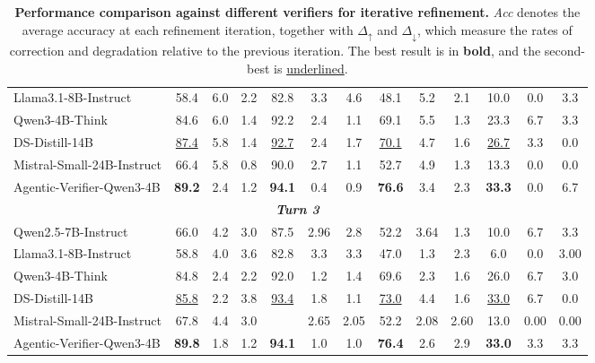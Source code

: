 \documentclass[11pt]{article}
\begin{document}
\begin{table}[t]
{\begin{tabular}{l|cccccccccccc}
Llama3.1-8B-Instruct
& 58.4 & 6.0 & 2.2
& 82.8 & 3.3 & 4.6
& 48.1 & 5.2 & 2.1
& 10.0 & 0.0 & 3.3 \\

Qwen3-4B-Think
& 84.6 & 6.0 & 1.4
& 92.2 & 2.4 & 1.1
& 69.1 & 5.5 & 1.3
& 23.3 & 6.7 & 3.3 \\

DS-Distill-14B
& \underline{87.4} & 5.8 & 1.4
& \underline{92.7} & 2.4 & 1.7
& \underline{70.1} & 4.7 & 1.6
& \underline{26.7} & 3.3 & 0.0 \\

Mistral-Small-24B-Instruct
& 66.4 & 5.8 & 0.8
& 90.0 & 2.7 & 1.1
& 52.7 & 4.9 & 1.3
& 13.3 & 0.0 & 0.0 \\

Agentic-Verifier-Qwen3-4B
& \textbf{89.2} & 2.4 & 1.2
& \textbf{94.1} & 0.4 & 0.9
& \textbf{76.6} & 3.4 & 2.3
& \textbf{33.3} & 0.0 & 6.7 \\
        \midrule
            \multicolumn{13}{c}{\textit{\textbf{Turn 3}}} \\
        \midrule
        Qwen2.5-7B-Instruct
& 66.0 & 4.2 & 3.0
& 87.5 & 2.96 & 2.8
& 52.2 & 3.64 & 1.3
& 10.0 & 6.7 & 3.3 \\

Llama3.1-8B-Instruct
& 58.8 & 4.0 & 3.6
& 82.8 & 3.3 & 3.3
& 47.0 & 1.3 & 2.3
& 6.0 & 0.0 & 3.00 \\

Qwen3-4B-Think
& 84.8 & 2.4 & 2.2
& 92.0 & 1.2 & 1.4
& 69.6 & 2.3 & 1.6
& 26.0 & 6.7 & 3.0 \\

DS-Distill-14B
& \underline{85.8} & 2.2 & 3.8
& \underline{93.4} & 1.8 & 1.1
& \underline{73.0} & 4.4 & 1.6
& \underline{33.0} & 6.7 & 0.0 \\

Mistral-Small-24B-Instruct
& 67.8 & 4.4 & 3.0
& \cellcolor{lightgreen1}{90.6} & 2.65 & 2.05
& 52.2 & 2.08 & 2.60
& 13.0 & 0.00 & 0.00 \\

Agentic-Verifier-Qwen3-4B
& \textbf{89.8} & 1.8 & 1.2
& \textbf{94.1} & 1.0 & 1.0
& \textbf{76.4} & 2.6 & 2.9
& \textbf{33.0} & 3.3 & 3.3 \\
        \bottomrule[1.6pt]
    \end{tabular}
    }
\caption{\textbf{Performance comparison against different verifiers for iterative refinement.}
\textit{Acc} denotes the average accuracy at each refinement iteration, together with $\Delta_\uparrow$ and $\Delta_\downarrow$, which measure the rates of correction and degradation relative to the previous iteration.
The best result is in \textbf{bold}, and the second-best is \underline{underlined}.
}
\label{Tab:Main_Exp_Refine}
\vspace{-2mm}
\end{table}
\end{document}
